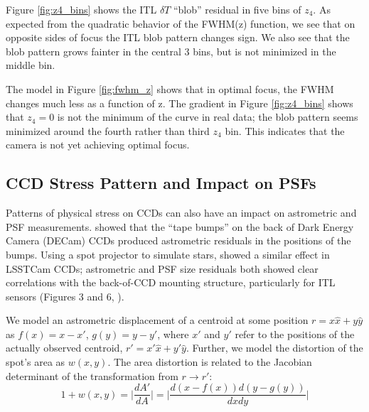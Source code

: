 \documentclass[SE,lsstdraft,authoryear,toc]{lsstdoc}
\begin{document}
Figure \ref{fig:z4_bins} shows the ITL $\delta T$ ``blob'' residual in five bins of $z_4$. 
As expected from the quadratic behavior of the FWHM(z) function, we see that on opposite sides of focus the ITL blob pattern changes sign.
We also see that the blob pattern grows fainter in the central 3 bins, but is not minimized in the middle bin.

The model in Figure \ref{fig:fwhm_z} shows that in optimal focus, the FWHM changes much less as a function of z. 
The gradient in Figure \ref{fig:z4_bins} shows that $z_4=0$ is not the minimum of the curve in real data; the blob pattern seems minimized around the fourth rather than third $z_4$ bin.
This indicates that the camera is not yet achieving optimal focus.

\subsection{CCD Stress Pattern and Impact on PSFs}
Patterns of physical stress on CCDs can also have an impact on astrometric and PSF measurements. 
\cite{2017PASP..129g4503B} showed that the ``tape bumps'' on the back of Dark Energy Camera (DECam) CCDs produced astrometric residuals in the positions of the bumps.
Using a spot projector to simulate stars, \cite{Esteves2023} showed a similar effect in LSSTCam CCDs; astrometric and PSF size residuals both showed clear correlations with the back-of-CCD mounting structure, particularly for ITL sensors (Figures 3 and 6, \cite{Esteves2023}). 

We model an astrometric displacement of a centroid at some position $r=x\hat{x}+y{\hat{y}}$ as $f(x) = x-x'$, $g(y) = y-y'$, where $x'$ and $y'$ refer to the positions of the actually observed centroid, $r'=x'\hat{x}+y'{\hat{y}}$.
Further, we model the distortion of the spot's area as $w(x,y)$.
The area distortion is related to the Jacobian determinant of the transformation from $r\rightarrow r'$:
\begin{equation}
    1+w(x, y) = \bigg|\frac{dA'}{dA}\bigg| = \bigg|\frac{d(x-f(x))d(y-g(y))}{dxdy}\bigg|
\end{equation}
\end{document}
